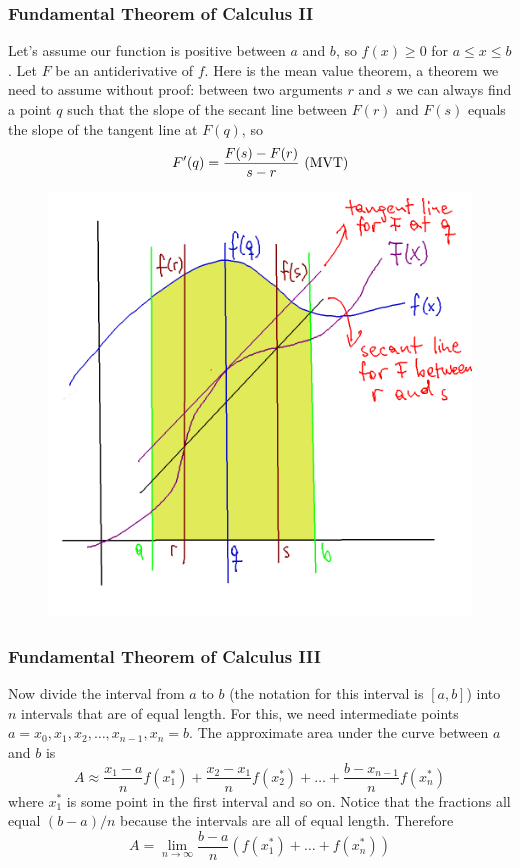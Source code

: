 \documentclass[xcolor=dvipsnames]{beamer}
\begin{document}
\begin{frame}
  \frametitle{Fundamental Theorem of Calculus II}
Let's assume our function is positive between $a$ and $b$, so
$f(x)\geq{}0$ for $a\leq{}x\leq{}b$. Let $F$ be an antiderivative of
$f$. Here is the \alert{mean value theorem}, a theorem we need to
assume without proof: between two arguments $r$ and $s$ we can always
find a point $q$ such that the slope of the secant line between $F(r)$
and $F(s)$ equals the slope of the tangent line at $F(q)$, so
\begin{equation}
  \label{eq:zahrahsi}
  F'(q)=\frac{F(s)-F(r)}{s-r}\mbox{ (MVT)}\notag
\end{equation}
\begin{figure}[h]
\includegraphics[scale=.13]{./diagrams/ftoc-01.png}
\end{figure}
\end{frame}

\begin{frame}
  \frametitle{Fundamental Theorem of Calculus III}
Now divide the interval from $a$ to $b$ (the notation for this
interval is $[a,b]$) into $n$ intervals that are of equal length. For
this, we need intermediate points
$a=x_{0},x_{1},x_{2},\ldots,x_{n-1},x_{n}=b$. The approximate area
under the curve between $a$ and $b$ is
\begin{equation}
  \label{eq:eikaidei}
  A\approx\frac{x_{1}-a}{n}f(x_{1}^{*})+\frac{x_{2}-x_{1}}{n}f(x_{2}^{*})+\ldots+\frac{b-x_{n-1}}{n}f(x_{n}^{*})
\end{equation}
where $x_{1}^{*}$ is some point in the first interval and so on.
Notice that the fractions all equal $(b-a)/n$ because the intervals
are all of equal length. Therefore
\begin{equation}
  \label{eq:pukaepha}
  A=\lim_{n\rightarrow\infty}\frac{b-a}{n}\left(f(x_{1}^{*})+\ldots+f(x_{n}^{*})\right)
\end{equation}
\end{frame}
\end{document}
